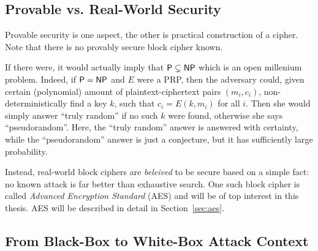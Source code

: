 
\subsection{Provable vs. Real-World Security}
\label{sec:provable}

Provable security is one aspect, the other is practical construction of a cipher. Note that there is no provably secure block cipher known.

If there were, it would actually imply that $\mathsf{P} \subsetneq \mathsf{NP}$ which is an open millenium problem. Indeed, if $\mathsf{P} = \mathsf{NP}$ and $E$ were a PRP, then the adversary could, given certain (polynomial) amount of plaintext-ciphertext pairs $(m_i,c_i)$, non-deterministically find a key $k$, such that $c_i = E(k,m_i)$ for all $i$. Then she would simply answer ``truly random'' if no such $k$ were found, otherwise she says ``pseudorandom''. Here, the ``truly random'' answer is answered with certainty, while the ``pseudorandom'' answer is just a conjecture, but it has sufficiently large probability.

Instead, real-world block ciphers are {\em beleived} to be secure based on a simple fact: no known attack is far better than exhaustive search. One such block cipher is called {\em Advanced Encryption Standard} (AES) and will be of top interest in this thesis. AES will be described in detail in Section~\ref{sec:aes}.



\subsection{From Black-Box to White-Box Attack Context}
\label{sec:bbtowb}


